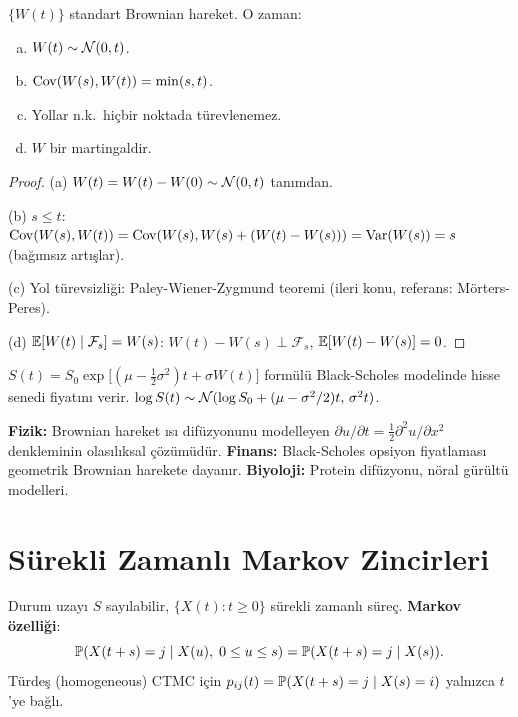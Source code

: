 \begin{teorem}\label{thm:brownian_ozellik}
$\{W(t)\}$ standart Brownian hareket. O zaman:
\begin{enumerate}[(a)]
  \item $W(t)\sim\mathcal{N}(0,t)$.
  \item $\operatorname{Cov}(W(s),W(t))=\min(s,t)$.
  \item Yollar n.k.\ hiçbir noktada türevlenemez.
  \item $W$ bir martingaldir.
\end{enumerate}
\end{teorem}

\begin{proof}
(a) $W(t)=W(t)-W(0)\sim\mathcal{N}(0,t)$ tanımdan.

(b) $s\leq t$: $\operatorname{Cov}(W(s),W(t))=\operatorname{Cov}(W(s),W(s)+(W(t)-W(s)))=\operatorname{Var}(W(s))=s$ (bağımsız artışlar).

(c) Yol türevsizliği: Paley-Wiener-Zygmund teoremi (ileri konu, referans: Mörters-Peres).

(d) $\mathbb{E}[W(t)\mid\mathcal{F}_s]=W(s)$: $W(t)-W(s)\perp\mathcal{F}_s$, $\mathbb{E}[W(t)-W(s)]=0$.
\end{proof}

\begin{ornek}\label{ex:geometrik_brownian}
$S(t) = S_0\exp\!\bigl[(\mu-\tfrac{1}{2}\sigma^2)t + \sigma W(t)\bigr]$ formülü Black-Scholes modelinde hisse senedi fiyatını verir. $\log S(t)\sim\mathcal{N}(\log S_0+(\mu-\sigma^2/2)t,\,\sigma^2 t)$.
\end{ornek}

\begin{disiplinlerarasibaglan}
\textbf{Fizik:} Brownian hareket ısı difüzyonunu modelleyen $\partial u/\partial t = \frac{1}{2}\partial^2 u/\partial x^2$ denkleminin olasılıksal çözümüdür.
\textbf{Finans:} Black-Scholes opsiyon fiyatlaması geometrik Brownian harekete dayanır.
\textbf{Biyoloji:} Protein difüzyonu, nöral gürültü modelleri.
\end{disiplinlerarasibaglan}

\section{Sürekli Zamanlı Markov Zincirleri}
\label{sec:ctmc}

\begin{tanim}\label{def:ctmc}
Durum uzayı $S$ sayılabilir, $\{X(t):t\geq0\}$ sürekli zamanlı süreç. \textbf{Markov özelliği}:
\[
  \mathbb{P}(X(t+s)=j\mid X(u),\;0\leq u\leq s) = \mathbb{P}(X(t+s)=j\mid X(s)).
\]
Türdeş (homogeneous) CTMC için $p_{ij}(t)=\mathbb{P}(X(t+s)=j\mid X(s)=i)$ yalnızca $t$'ye bağlı.
\end{tanim}

